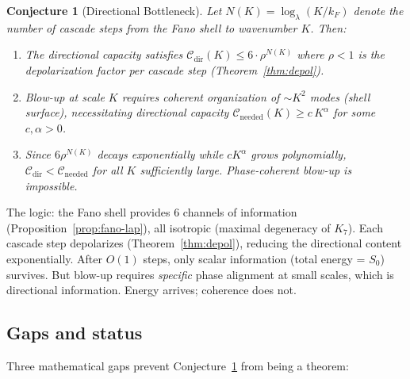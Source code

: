 \documentclass[11pt]{article}
\newtheorem{conjecture}[theorem]{Conjecture}
\theoremstyle{definition}
\theoremstyle{remark}
\begin{document}
\begin{conjecture}[Directional Bottleneck]\label{conj:bottleneck}
Let $N(K) = \log_\lambda(K/k_F)$ denote the number of cascade steps
from the Fano shell to wavenumber $K$. Then:
\begin{enumerate}
  \item The directional capacity satisfies
    $\mathcal{C}_{\mathrm{dir}}(K) \leq 6 \cdot \rho^{N(K)}$
    where $\rho < 1$ is the depolarization factor per cascade step
    (Theorem~\ref{thm:depol}).
  \item Blow-up at scale $K$ requires coherent organization of
    $\sim K^2$ modes (shell surface), necessitating directional
    capacity $\mathcal{C}_{\mathrm{needed}}(K) \geq c\,K^\alpha$
    for some $c, \alpha > 0$.
  \item Since $6\rho^{N(K)}$ decays exponentially while
    $cK^\alpha$ grows polynomially,
    $\mathcal{C}_{\mathrm{dir}} < \mathcal{C}_{\mathrm{needed}}$
    for all $K$ sufficiently large. Phase-coherent blow-up is
    impossible.
\end{enumerate}
\end{conjecture}

The logic: the Fano shell provides 6 channels of information
(Proposition~\ref{prop:fano-lap}), all isotropic (maximal degeneracy
of $K_7$). Each cascade step depolarizes
(Theorem~\ref{thm:depol}), reducing the directional content
exponentially. After $O(1)$ steps, only scalar information (total
energy = $S_0$) survives. But blow-up requires \emph{specific}
phase alignment at small scales, which is directional information.
Energy arrives; coherence does not.

\subsection{Gaps and status}

Three mathematical gaps prevent Conjecture~\ref{conj:bottleneck} from
being a theorem:
\end{document}
